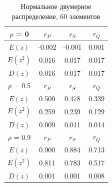 \documentclass[12pt,a4paper]{article}
\begin{document}
			\begin{table}[htp]
			\label{coeffs_default_60}
				\begin{center}
					\begin{tabular}{|c|c|c|c|}
						\hline	
						$\rho$ = 0 & $r_P$ & $r_S$ & $r_Q$ \\ \hline
						$E(z)$ & -0.002 & -0.001 & 0.001 \\ \hline
						$E(z^2)$ & 0.016 & 0.017 & 0.017 \\ \hline
						$D(z)$ & 0.016 & 0.017 & 0.017 \\ \hline
						
						$\rho$ = 0.5 & $r_P$ & $r_S$ & $r_Q$ \\ \hline
						$E(z)$ & 0.500 & 0.478 & 0.339 \\ \hline
						$E(z^2)$ & 0.259 & 0.239 & 0.129 \\ \hline
						$D(z)$ & 0.009 & 0.011 & 0.014 \\ \hline
						
						$\rho$ = 0.9 & $r_P$ & $r_S$ & $r_Q$ \\ \hline
						$E(z)$ & 0.900 & 0.884 & 0.713 \\ \hline
						$E(z^2)$ & 0.811 & 0.783 & 0.517 \\ \hline
						$D(z)$ & 0.001 & 0.001 & 0.008 \\ \hline
						
					\end{tabular}
				\end{center}
			\caption{Нормальное двумерное распределение, 60 элементов}
			\end{table}	
	 		\newpage		
		
\end{document}
